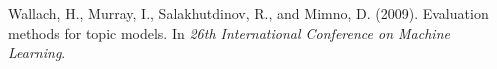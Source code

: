 \documentclass[twoside]{article}
\begin{document}
{\small
\vspace{-0.1cm}
\begin{thebibliography}{1}

Wallach, H., Murray, I., Salakhutdinov, R., and Mimno, D. (2009).
\newblock Evaluation methods for topic models.
\newblock In \emph{26th International Conference on Machine
  Learning}.

\end{thebibliography}
}
\end{document}
